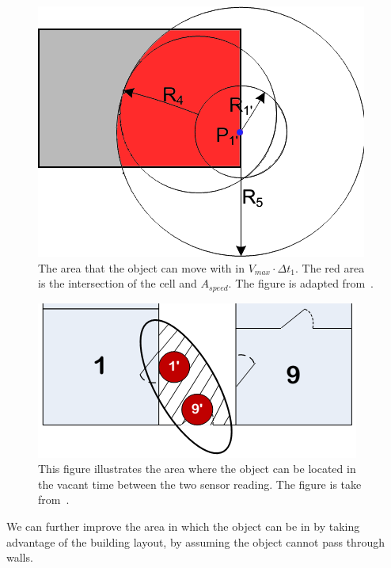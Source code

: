 \begin{figure}%
\centering
\includegraphics[width=0.5\columnwidth]{images/speed.png}%
\caption{The area that the object can move with in $V_{max}\cdot\Delta t_1$. The red area is the intersection of the cell and $A_{speed}$. The figure is adapted from~\cite{Jensen:2009:GMB:1590953.1591000}.}%
\label{fig:speed1}%
\end{figure}
\begin{figure}%
\centering
\includegraphics[width=0.8\columnwidth]{images/speed2.png}%
\caption{This figure illustrates the area where the object can be located in the vacant time between the two sensor reading. The figure is take from~\cite{Jensen:2009:GMB:1590953.1591000}.}%
\label{fig:speed2}%
\end{figure}
We can further improve the area in which the object can be in by taking advantage of the building layout, by assuming the object cannot pass through walls. 




